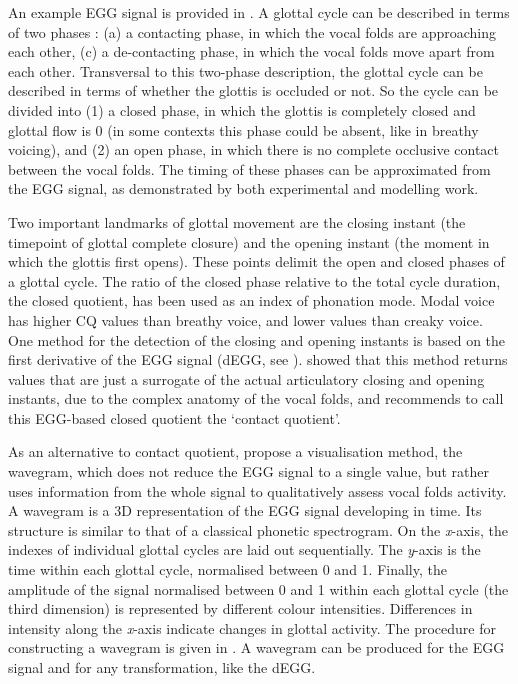 \documentclass[
  12pt,
  a4paper,
]{article}
\begin{document}
An example EGG signal is provided in . A glottal cycle can
be described in terms of two phases \citep{childers1985, hampala2016}:
(a) a contacting phase, in which the vocal folds are approaching each
other, (c) a de-contacting phase, in which the vocal folds move apart
from each other. Transversal to this two-phase description, the glottal
cycle can be described in terms of whether the glottis is occluded or
not. So the cycle can be divided into (1) a closed phase, in which the
glottis is completely closed and glottal flow is 0 (in some contexts
this phase could be absent, like in breathy voicing), and (2) an open
phase, in which there is no complete occlusive contact between the vocal
folds. The timing of these phases can be approximated from the EGG
signal, as demonstrated by both experimental and modelling work.

Two important landmarks of glottal movement are the closing instant (the
timepoint of glottal complete closure) and the opening instant (the
moment in which the glottis first opens). These points delimit the open
and closed phases of a glottal cycle. The ratio of the closed phase
relative to the total cycle duration, the closed quotient, has been used
as an index of phonation mode. Modal voice has higher CQ values than
breathy voice, and lower values than creaky voice. One method for the
detection of the closing and opening instants is based on the first
derivative of the EGG signal (dEGG, see ).
\citet{herbst2017} showed that this method returns values that are just
a surrogate of the actual articulatory closing and opening instants, due
to the complex anatomy of the vocal folds, and recommends to call this
EGG-based closed quotient the `contact quotient'.

As an alternative to contact quotient, \citet{herbst2010} propose a
visualisation method, the wavegram, which does not reduce the EGG signal
to a single value, but rather uses information from the whole signal to
qualitatively assess vocal folds activity. A wavegram is a 3D
representation of the EGG signal developing in time. Its structure is
similar to that of a classical phonetic spectrogram. On the
\emph{x}-axis, the indexes of individual glottal cycles are laid out
sequentially. The \emph{y}-axis is the time within each glottal cycle,
normalised between 0 and 1. Finally, the amplitude of the signal
normalised between 0 and 1 within each glottal cycle (the third
dimension) is represented by different colour intensities. Differences
in intensity along the \emph{x}-axis indicate changes in glottal
activity. The procedure for constructing a wavegram is given in
. A wavegram can be produced for the EGG signal and for
any transformation, like the dEGG.
\end{document}
